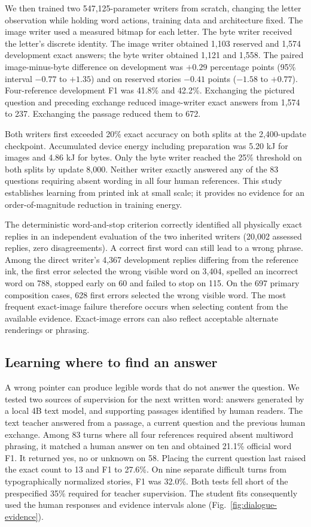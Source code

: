 \documentclass[12pt,a4paper]{article}
\providecommand{\DIFadd}[1]{{\protect\color{blue} \sf #1}} %
\begin{document}
\DIFadd{We then trained two 547,125-parameter writers from scratch, changing the letter observation while holding word actions, training data and architecture fixed. The image writer used a measured bitmap for each letter. The byte writer received the letter's discrete identity. The image writer obtained 1,103 reserved and 1,574 development exact answers; the byte writer obtained 1,121 and 1,558. The paired image-minus-byte difference on development was $+0.29$ percentage points (95\% interval $-0.77$ to $+1.35$) and on reserved stories $-0.41$ points ($-1.58$ to $+0.77$). Four-reference development F1 was 41.8\% and 42.2\%. Exchanging the pictured question and preceding exchange reduced image-writer exact answers from 1,574 to 237. Exchanging the passage reduced them to 672.
}

\DIFadd{Both writers first exceeded 20\% exact accuracy on both splits at the 2,400-update checkpoint. Accumulated device energy including preparation was 5.20 kJ for images and 4.86 kJ for bytes. Only the byte writer reached the 25\% threshold on both splits by update 8,000. Neither writer exactly answered any of the 83 questions requiring absent wording in all four human references. This study establishes learning from printed ink at small scale; it provides no evidence for an order-of-magnitude reduction in training energy.
}

\DIFadd{The deterministic word-and-stop criterion correctly identified all physically exact replies in an independent evaluation of the two inherited writers (20,002 assessed replies, zero disagreements). A correct first word can still lead to a wrong phrase. Among the direct writer's 4,367 development replies differing from the reference ink, the first error selected the wrong visible word on 3,404, spelled an incorrect word on 788, stopped early on 60 and failed to stop on 115. On the 697 primary composition cases, 628 first errors selected the wrong visible word. The most frequent exact-image failure therefore occurs when selecting content from the available evidence. Exact-image errors can also reflect acceptable alternate renderings or phrasing.
}

\subsection*{\DIFadd{Learning where to find an answer}}
\DIFadd{A wrong pointer can produce legible words that do not answer the question. We tested two sources of supervision for the next written word: answers generated by a local 4B text model, and supporting passages identified by human readers. The text teacher answered from a passage, a current question and the previous human exchange. Among 83 turns where all four references required absent multiword phrasing, it matched a human answer on ten and obtained 21.1\% official word F1. It returned yes, no or unknown on 58. Placing the current question last raised the exact count to 13 and F1 to 27.6\%. On nine separate difficult turns from typographically normalized stories, F1 was 32.0\%. Both tests fell short of the prespecified 35\% required for teacher supervision. The student fits consequently used the human responses and evidence intervals alone (Fig.~\ref{fig:dialogue-evidence}).
}
\end{document}
